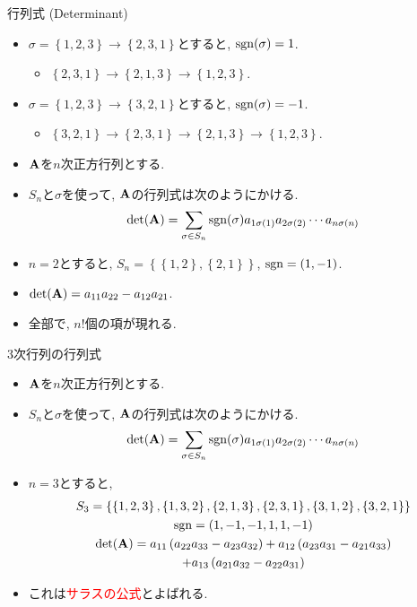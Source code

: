 \documentclass[dvipdfmx,notheorems,t]{beamer}
\begin{document}
\begin{frame}{行列式 (Determinant)}
\begin{itemize}
  \item $\sigma = \left\{ 1, 2, 3 \right\} \to \left\{ 2, 3, 1 \right\}$とすると, $\operatorname{sgn}(\sigma) = 1$.
  \begin{itemize}
    \item $\left\{ 2, 3, 1 \right\} \to \left\{ 2, 1, 3 \right\} \to \left\{ 1, 2, 3 \right\}$.
  \end{itemize}
  \item $\sigma = \left\{ 1, 2, 3 \right\} \to \left\{ 3, 2, 1 \right\}$とすると, $\operatorname{sgn}(\sigma) = -1$.
  \begin{itemize}
    \item $\left\{ 3, 2, 1 \right\} \to \left\{ 2, 3, 1 \right\} \to \left\{ 2, 1, 3 \right\}
      \to \left\{ 1, 2, 3 \right\}$.
  \end{itemize}
  \item $\vb{A}$を$n$次正方行列とする.
  \item $S_n$と$\sigma$を使って, $\vb{A}$の行列式は次のようにかける.
  $$\det(\vb{A}) = \sum_{\sigma \in S_n} \operatorname{sgn}(\sigma)
    a_{1 \sigma(1)} a_{2 \sigma(2)} \cdots a_{n \sigma(n)}$$
  \item $n = 2$とすると, $S_n = \left\{ \left\{ 1, 2 \right\}, \left\{ 2, 1 \right\} \right\}$,
  $\operatorname{sgn} = (1, -1)$.
  \item $\det(\vb{A}) = a_{11} a_{22} - a_{12} a_{21}$.
  \item 全部で, $n!$個の項が現れる.
\end{itemize}
\end{frame}

\begin{frame}{3次行列の行列式}
\begin{itemize}
  \item $\vb{A}$を$n$次正方行列とする.
  \item $S_n$と$\sigma$を使って, $\vb{A}$の行列式は次のようにかける.
  $$\det(\vb{A}) = \sum_{\sigma \in S_n} \operatorname{sgn}(\sigma)
    a_{1 \sigma(1)} a_{2 \sigma(2)} \cdots a_{n \sigma(n)}$$
  \item $n = 3$とすると,
  \begin{gather*}
    S_3 = \left\{ \left\{ 1, 2, 3 \right\}, \left\{ 1, 3, 2 \right\},
      \left\{ 2, 1, 3 \right\}, \left\{ 2, 3, 1 \right\},
      \left\{ 3, 1, 2 \right\}, \left\{ 3, 2, 1 \right\} \right\} \\
    \operatorname{sgn} = (1, -1, -1, 1, 1, -1) \\
    \det(\vb{A}) = a_{11} \left( a_{22} a_{33} - a_{23} a_{32} \right)
      + a_{12} \left( a_{23} a_{31} - a_{21} a_{33} \right) \\
      + a_{13} \left( a_{21} a_{32} - a_{22} a_{31} \right)
  \end{gather*}
  \item これは\textcolor{red}{サラスの公式}とよばれる.
\end{itemize}
\end{frame}
\end{document}
